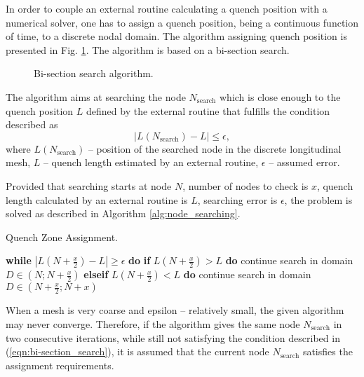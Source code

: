 
In order to couple an external routine calculating a quench position with a numerical solver, one has to assign a quench position, being a continuous function of time, to a discrete nodal domain. The algorithm assigning quench position is presented in Fig. \ref{fig:node_search_algo}. The algorithm is based on a bi-section search. 

\begin{figure}[H]
\centering
{}
\caption{Bi-section search algorithm.}
\label{fig:node_search_algo}
\end{figure}

The algorithm aims at searching the node $N_\text{search}$ which is close enough to the quench position $L$ defined by the external routine that fulfills the condition described as
\begin{equation}
    |L(N_\text{search}) - L| \leq \epsilon,
    \label{eqn:bi-section_search}
\end{equation}
where $L(N_\text{search})$ -- position of the searched node in the discrete longitudinal mesh, $L$ -- quench length estimated by an external routine, $\epsilon$ -- assumed error. 

Provided that searching starts at node $N$, number of nodes to check is $x$, quench length calculated by an external routine is $L$, searching error is $\epsilon$, the problem is solved as described in Algorithm \ref{alg:node_searching}.

\begin{algorithm}[H]
    \caption{Quench Zone Assignment.}
    \label{alg:node_searching}
    \begin{algorithmic}[1]

    \STATE \textbf{while} $|L(N+\frac{x}{2}) - L| \geq \epsilon$ \textbf{do}
    \STATE \hspace{0.5cm} \textbf{if} $L(N+\frac{x}{2}) > L$ \textbf{do}
    \STATE \hspace{1.0cm} continue search in domain $D \in (N;N + \frac{x}{2})$
    \STATE \hspace{0.5cm} \textbf{elseif} $L(N+\frac{x}{2}) < L$ \textbf{do}
    \STATE \hspace{1.0cm} continue search in domain $D \in (N + \frac{x}{2}; N+x)$
    \end{algorithmic}
\end{algorithm}

When a mesh is very coarse and epsilon -- relatively small, the given algorithm may never converge. Therefore, if the algorithm gives the same node $N_\text{search}$ in two consecutive iterations, while still not satisfying the condition described in (\ref{eqn:bi-section_search}), it is assumed that the current node $N_\text{search}$ satisfies the assignment requirements.